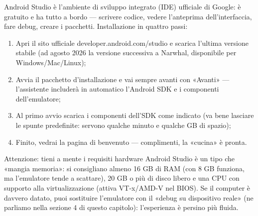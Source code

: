 


Android Studio è l'ambiente di sviluppo integrato (IDE) ufficiale di Google: è gratuito e ha tutto a bordo — scrivere codice, vedere l'anteprima dell'interfaccia, fare debug, creare i pacchetti. Installazione in quattro passi:

\begin{enumerate}
  \item Apri il sito ufficiale developer.android.com/studio e scarica l'ultima versione stabile (ad agosto 2026 la versione successiva a Narwhal, disponibile per Windows/Mac/Linux);
  \item Avvia il pacchetto d'installazione e vai sempre avanti con «Avanti» — l'assistente includerà in automatico l'Android SDK e i componenti dell'emulatore;
  \item Al primo avvio scarica i componenti dell'SDK come indicato (va bene lasciare le spunte predefinite: servono qualche minuto e qualche GB di spazio);
  \item Finito, vedrai la pagina di benvenuto — complimenti, la «cucina» è pronta.
\end{enumerate}

\begin{tcbwarn}{Attenzione: tieni a mente i requisiti hardware}
Android Studio è un tipo che «mangia memoria»: si consigliano almeno 16 GB di RAM (con 8 GB funziona, ma l'emulatore tende a scattare), 20 GB o più di disco libero e una CPU con supporto alla virtualizzazione (attiva VT-x/AMD-V nel BIOS). Se il computer è davvero datato, puoi sostituire l'emulatore con il «debug su dispositivo reale» (ne parliamo nella sezione 4 di questo capitolo): l'esperienza è persino più fluida.

\end{tcbwarn}


